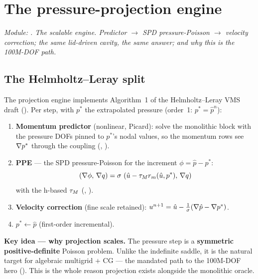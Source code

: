 \chapter{The pressure-projection engine}
\label{ch:c2}

\emph{Module: . The scalable engine.
Predictor $\to$ SPD pressure-Poisson $\to$ velocity correction; the same
lid-driven cavity, the same answer; and why this is the 100M-DOF path.}

\section{The Helmholtz--Leray split}
The projection engine implements Algorithm~1 of the Helmholtz--Leray VMS
draft (). Per step, with $p^{*}$ the extrapolated
pressure (order~1: $p^{*}=\hat p^n$):
\begin{enumerate}
\item \textbf{Momentum predictor} (nonlinear, Picard): solve the monolithic
  block with the pressure DOFs pinned to $p^{*}$'s nodal values, so the
  momentum rows see $\nabla p^{*}$ through the coupling
  (, ).
\item \textbf{PPE} --- the SPD pressure-Poisson for the increment
  $\phi=\hat p - p^{*}$:
  \[
  \left(\nabla\phi,\,\nabla q\right) = \sigma\,\left(\hat u - \tau_M r_m(\hat u,p^{*}),\,\nabla q\right)
  \]
  with the h-based $\tau_M$ (, ).
\item \textbf{Velocity correction} (fine scale retained):
  $u^{n+1}=\hat u - \tfrac1\sigma(\nabla\hat p - \nabla p^{*})$.
\item $p^{*}\leftarrow\hat p$ (first-order incremental).
\end{enumerate}

\begin{keybox}\textbf{Key idea --- why projection scales.} The pressure
step is a \textbf{symmetric positive-definite} Poisson problem. Unlike the
indefinite saddle, it is the natural target for algebraic multigrid $+$ CG
--- the mandated path to the 100M-DOF hero ().
This is the whole reason projection exists alongside the monolithic
oracle.\end{keybox}

